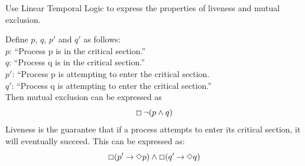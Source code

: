 \documentclass[]{exam}
\begin{document}
\begin{questions}

\question Use Linear Temporal Logic to express the properties of liveness and
mutual exclusion.
\begin{solution}
Define $p$, $q$, $p'$ and $q'$ as follows:\\

 $p$: ``Process p is in the critical section.''\\
 $q$: ``Process q is in the critical section.''\\ 
 $p'$: ``Process p is attempting to enter the critical section.\\
 $q'$: ``Process q is attempting to enter the critical section.''\\
Then mutual exclusion can be expressed as 
\[
  \Box \mathop{\neg} (p \land q)
\]
Liveness is the guarantee that if a process attempts to enter its critical section, it
will eventually succeed. This can be expressed as:
\[\Box (p' \mathbin{\rightarrow} \Diamond p) \land \Box (q' \mathbin{\rightarrow} \Diamond q)\]


\end{solution}
\end{questions}
\end{document}
